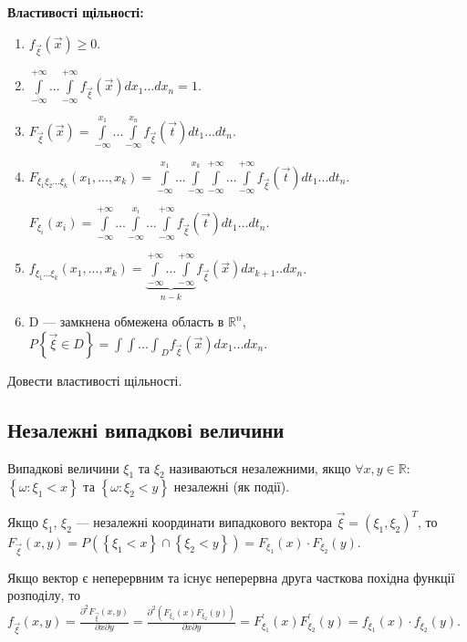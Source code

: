 \noindent \textbf{Властивості щільності:}
\begin{enumerate}
    \item $f_{\vec{\xi}}(\vec{x}) \geq 0$.
    \item $\int\limits_{-\infty}^{+\infty}...\int\limits_{-\infty}^{+\infty}
    f_{\vec{\xi}} (\vec{x})dx_1...dx_n = 1$.
    \item $F_{\vec{\xi}}(\vec{x}) = 
    \int\limits_{-\infty}^{x_1}...\int\limits_{-\infty}^{x_n}
    f_{\vec{\xi}} (\vec{t})dt_1...dt_n$.
    \item $F_{\xi_1\xi_2...\xi_k}(x_1, ..., x_k) = 
    \int\limits_{-\infty}^{x_1}...\int\limits_{-\infty}^{x_k}
    \int\limits_{-\infty}^{+\infty}...\int\limits_{-\infty}^{+\infty}
    f_{\vec{\xi}} (\vec{t})dt_1...dt_n$.

    $F_{\xi_i}(x_i) = \int\limits_{-\infty}^{+\infty}...
    \int\limits_{-\infty}^{x_i}...\int\limits_{-\infty}^{+\infty}
    f_{\vec{\xi}} (\vec{t})dt_1...dt_n$.

    \item $f_{\xi_1...\xi_k}(x_1, ..., x_k) = 
    \underbrace{
        \int\limits_{-\infty}^{+\infty} 
        ... 
        \int\limits_{-\infty}^{+\infty}
    }_{n-k} f_{\vec{\xi}}(\vec{x}) dx_{k+1}..dx_n$.
    \item D --- замкнена обмежена область в $\mathbb{R}^n$,
    $P\left\{\vec{\xi} \in D\right\} = {\int\int...\int}_D f_{\vec{\xi}}(\vec{x})
    dx_1 ... dx_n$.
\end{enumerate}
\begin{exercise}
    Довести властивості щільності.
\end{exercise}

\subsection{Незалежні випадкові величини}
\begin{definition}
    Випадкові величини $\xi_1$ та $\xi_2$ називаються незалежними, якщо 
    $\forall x, y \in \mathbb{R}$:  
    $\left\{\omega:\xi_1 < x\right\}$ та $\left\{\omega:\xi_2 < y\right\}$ 
    незалежні (як події).
\end{definition}
    Якщо $\xi_1$, $\xi_2$ --- незалежні координати випадкового вектора $\vec{\xi} = (\xi_1, \xi_2)^T$, 
    то $F_{\vec{\xi}}(x, y) = 
    P\left(\left\{\xi_1 < x\right\} \cap \left\{\xi_2 < y\right\}\right) = 
    F_{\xi_1}(x)\cdot F_{\xi_2}(y)$.

    Якщо вектор є неперервним та існує неперервна 
    друга часткова похідна функції розподілу, то
    $f_{\vec{\xi}}(x, y) = \frac{\partial^2 F_{\vec{\xi}}(x, y)}
    {\partial x \partial y} = \frac{\partial^2(F_{\xi_1}(x)F_{\xi_2}(y))}{\partial x \partial y} 
    = F_{\xi_1}^\prime (x)F_{\xi_2}^\prime (y) = 
    f_{\xi_1}(x)\cdot f_{\xi_2}(y)$.